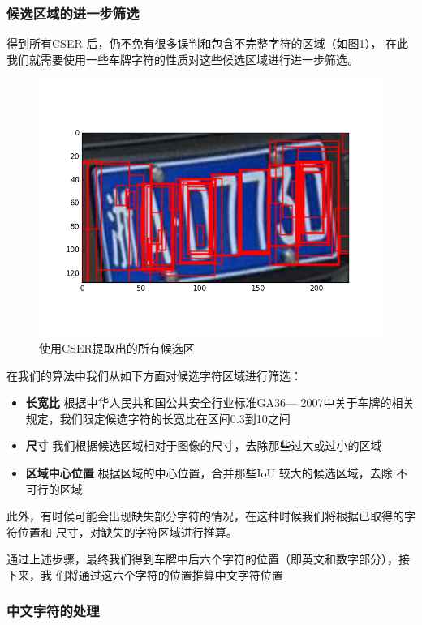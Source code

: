 \subsubsection{候选区域的进一步筛选}

得到所有CSER 后，仍不免有很多误判和包含不完整字符的区域（如图\ref{Fig:AllERs}），
在此我们就需要使用一些车牌字符的性质对这些候选区域进行进一步筛选。

\begin{figure}[ht]
  \centering
  \includegraphics[width=0.8\linewidth]{./Figure/AllERs.png}
  \caption{使用CSER提取出的所有候选区}\label{Fig:AllERs}
\end{figure}

在我们的算法中我们从如下方面对候选字符区域进行筛选：

\begin{itemize}
\item \textbf{长宽比} 根据中华人民共和国公共安全行业标准GA36— 2007中关于车牌的相关
  规定，我们限定候选字符的长宽比在区间0.3到10之间
\item \textbf{尺寸} 我们根据候选区域相对于图像的尺寸，去除那些过大或过小的区域
\item \textbf{区域中心位置} 根据区域的中心位置，合并那些IoU 较大的候选区域，去除
  不可行的区域
\end{itemize} 

此外，有时候可能会出现缺失部分字符的情况，在这种时候我们将根据已取得的字符位置和
尺寸，对缺失的字符区域进行推算。

通过上述步骤，最终我们得到车牌中后六个字符的位置（即英文和数字部分），接下来，我
们将通过这六个字符的位置推算中文字符位置

\subsubsection{中文字符的处理}

